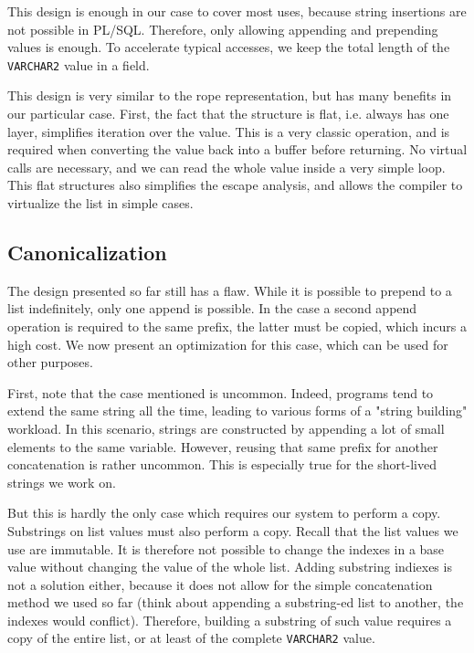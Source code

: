 \documentclass[twoside,11pt,a4paper]{article}
\newcommand{\pls}[1]{\texttt{#1}}
\newcommand{\plstype}[1]{\pls{#1}}
\newcommand{\varchar}{\plstype{VARCHAR2}}
\begin{document}
This design is enough in our case to cover most uses, because string insertions are not possible in PL/SQL. Therefore, only allowing appending and prepending values is enough. To accelerate typical accesses, we keep the total length of the \varchar{} value in a field.

This design is very similar to the rope representation, but has many benefits in our particular case. First, the fact that the structure is flat, i.e. always has one layer, simplifies iteration over the value. This is a very classic operation, and is required when converting the value back into a buffer before returning. No virtual calls are necessary, and we can read the whole value inside a very simple loop. This flat structures also simplifies the escape analysis, and allows the compiler to virtualize the list in simple cases.

\subsection{Canonicalization}


The design presented so far still has a flaw. While it is possible to prepend to a list indefinitely, only one append is possible. In the case a second append operation is required to the same prefix, the latter must be copied, which incurs a high cost. We now present an optimization for this case, which can be used for other purposes.

First, note that the case mentioned is uncommon. Indeed, programs tend to extend the same string all the time, leading to various forms of a "string building" workload. In this scenario, strings are constructed by appending a lot of small elements to the same variable. However, reusing that same prefix for another concatenation is rather uncommon. This is especially true for the short-lived strings we work on.

But this is hardly the only case which requires our system to perform a copy. Substrings on list values must also perform a copy. Recall that the list values we use are immutable. It is therefore not possible to change the indexes in a base value without changing the value of the whole list. Adding substring indiexes is not a solution either, because it does not allow for the simple concatenation method we used so far (think about appending a substring-ed list to another, the indexes would conflict). Therefore, building a substring of such value requires a copy of the entire list, or at least of the complete \varchar{} value.
\end{document}
